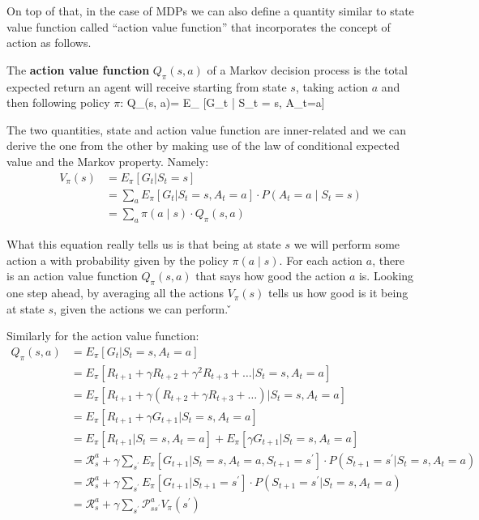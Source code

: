 On top of that, in the case of MDPs we can also define a quantity similar to state value function called ``action
value function'' that incorporates the concept of action as follows.


The \textbf{action value function } $Q_{\pi}(s, a)$ of a Markov decision process is the total expected return an
agent will receive starting from state $s$, taking action $a$ and then following policy $\pi$:
\bse
Q_{\pi}(s, a)= E_{\pi} [G_t | S_t = s, A_t=a]
\ese
\ed

The two quantities, state and action value function are inner-related and we can derive the one from the other by
making use of the law of conditional expected value and the Markov property. Namely:
\begin{align*}
V_{\pi}(s) &= E_{\pi} [G_t | S_t = s] \\
&= \sum_{a} E_{\pi} [G_t | S_t = s, A_t=a] \cdot P(A_t=a \mid S_t=s) \\
&= \sum_{a} \pi(a \mid s) \cdot Q_{\pi}(s, a)
\end{align*}

What this equation really tells us is that being at state $s$ we will perform some action a with probability given by
the policy $\pi(a \mid s)$. For each action $a$, there is an action value function $Q_{\pi}(s, a)$ that says how good
the action $a$ is. Looking one step ahead, by averaging all the actions $V_{\pi}(s)$ tells us how good is it being at
state $s$, given the actions we can perform. \v


Similarly for the action value function:
\begingroup
\allowdisplaybreaks
{\setlength{\jot}{10pt}
\begin{align*}
Q_{\pi}(s, a) &= E_{\pi} [G_t | S_t = s, A_t=a] \\
&= E_{\pi} [R_{t+1} + \gamma R_{t+2} + \gamma^2 R_{t+3} + \ldots | S_t = s, A_t=a] \\
&= E_{\pi} [R_{t+1} + \gamma (R_{t+2} + \gamma R_{t+3} + \ldots) | S_t = s, A_t=a] \\
&= E_{\pi} [R_{t+1} + \gamma G_{t+1} | S_t = s, A_t=a] \\
&= E_{\pi} [R_{t+1}| S_t = s, A_t=a] + E_{\pi} [\gamma G_{t+1} | S_t = s, A_t=a] \\
&= \mathcal{R}_{s}^{a} + \gamma \sum_{s^\prime} E_{\pi} [G_{t+1} | S_t = s, A_t=a, S_{t+1} = s^\prime]
\cdot P(S_{t+1} = s^\prime | S_t = s, A_t=a) \\
&= \mathcal{R}_{s}^{a} + \gamma \sum_{s^\prime} E_{\pi} [G_{t+1} | S_{t+1} = s^\prime]
\cdot P(S_{t+1} = s^\prime | S_t = s, A_t=a) \\
&= \mathcal{R}_{s}^{a} + \gamma \sum_{s^{\prime}} \mathcal{P}_{s s^\prime}^{a} V_{\pi}(s^\prime)
\end{align*}}
\endgroup

